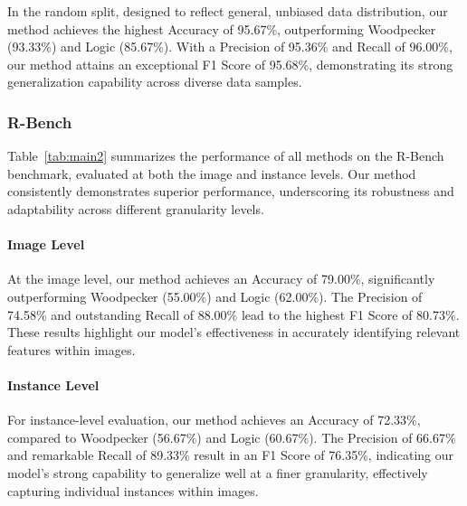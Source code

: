 In the random split, designed to reflect general, unbiased data distribution, our method achieves the highest Accuracy of 95.67\%, outperforming Woodpecker (93.33\%) and Logic (85.67\%). With a Precision of 95.36\% and Recall of 96.00\%, our method attains an exceptional F1 Score of 95.68\%, demonstrating its strong generalization capability across diverse data samples.







\subsubsection{R-Bench}

Table~\ref{tab:main2} summarizes the performance of all methods on the R-Bench benchmark, evaluated at both the image and instance levels. Our method consistently demonstrates superior performance, underscoring its robustness and adaptability across different granularity levels.

\vspace{-4pt}
\paragraph{Image Level}

At the image level, our method achieves an Accuracy of 79.00\%, significantly outperforming Woodpecker (55.00\%) and Logic (62.00\%). The Precision of 74.58\% and outstanding Recall of 88.00\% lead to the highest F1 Score of 80.73\%. These results highlight our model's effectiveness in accurately identifying relevant features within images.

\vspace{-4pt}
\paragraph{Instance Level}

For instance-level evaluation, our method achieves an Accuracy of 72.33\%, compared to Woodpecker (56.67\%) and Logic (60.67\%). The Precision of 66.67\% and remarkable Recall of 89.33\% result in an F1 Score of 76.35\%, indicating our model's strong capability to generalize well at a finer granularity, effectively capturing individual instances within images.

